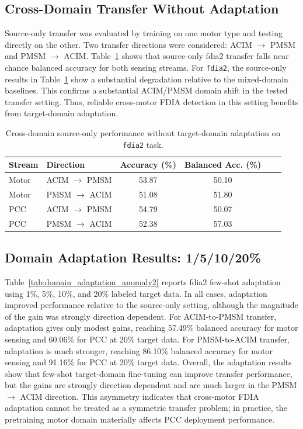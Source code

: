 \documentclass[lettersize,journal]{IEEEtran}
\begin{document}
\subsection{Cross-Domain Transfer Without Adaptation}
\label{sec:cross_domain}
Source-only transfer was evaluated by training on one motor type and testing directly on the other. Two transfer directions were considered: ACIM $\rightarrow$ PMSM and PMSM $\rightarrow$ ACIM. Table~\ref{tab:cross_domain_source_only} shows that source-only fdia2 transfer falls near chance balanced accuracy for both sensing streams. For \texttt{fdia2}, the source-only results in Table~\ref{tab:cross_domain_source_only} show a substantial degradation relative to the mixed-domain baselines. This confirms a substantial ACIM/PMSM domain shift in the tested transfer setting. Thus, reliable cross-motor FDIA detection in this setting benefits from target-domain adaptation.
\begin{table}[t]
\centering
\caption{Cross-domain source-only performance without target-domain adaptation on \texttt{fdia2} task.}
\label{tab:cross_domain_source_only}
\renewcommand{\arraystretch}{1.15}
\begin{tabular}{l l c c c c}
\hline
Stream & Direction & Accuracy (\%) & Balanced Acc. (\%) \\
\hline
Motor & ACIM $\rightarrow$ PMSM & 53.87 & 50.10 \\
Motor & PMSM $\rightarrow$ ACIM & 51.08 & 51.80 \\
PCC   & ACIM $\rightarrow$ PMSM & 54.79 & 50.07 \\
PCC   & PMSM $\rightarrow$ ACIM & 52.38 & 57.03 \\
\hline
\end{tabular}
\end{table}
\subsection{Domain Adaptation Results: 1/5/10/20\%}
\label{sec:adaptation_results}
Table~\ref{tab:domain_adaptation_anomaly2} reports fdia2 few-shot adaptation using 1\%, 5\%, 10\%, and 20\% labeled target data. In all cases, adaptation improved performance relative to the source-only setting, although the magnitude of the gain was strongly direction dependent. For ACIM-to-PMSM transfer, adaptation gives only modest gains, reaching 57.49\% balanced accuracy for motor sensing and 60.06\% for PCC at 20\% target data. For PMSM-to-ACIM transfer, adaptation is much stronger, reaching 86.10\% balanced accuracy for motor sensing and 91.16\% for PCC at 20\% target data.
Overall, the adaptation results show that few-shot target-domain fine-tuning can improve transfer performance, but the gains are strongly direction dependent and are much larger in the PMSM $\rightarrow$ ACIM direction. This asymmetry indicates that cross-motor FDIA adaptation cannot be treated as a symmetric transfer problem; in practice, the pretraining motor domain materially affects PCC deployment performance.
\end{document}
